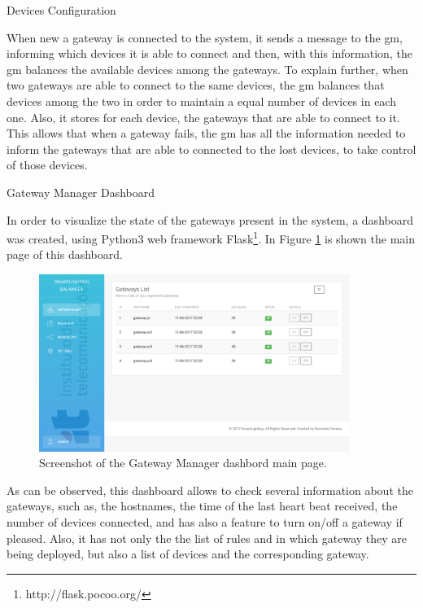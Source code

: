 \begin{Paragraph}{Devices Configuration}

When new a gateway is connected to the system, it sends a message to the \ac{gm}, informing which devices it is able to connect and then, with this information, the \ac{gm} balances the available devices among the gateways. To explain further, when two gateways are able to connect to the same devices, the \ac{gm} balances that devices among the two in order to maintain a equal number of devices in each one. Also, it stores for each device, the gateways that are able to connect to it. This allows that when a gateway fails, the \ac{gm} has all the information needed to inform the gateways that are able to connected to the lost devices, to take control of those devices.

\end{Paragraph}

\begin{Paragraph}{Gateway Manager Dashboard}

In order to visualize the state of the gateways present in the system, a dashboard was created, using Python3 web framework Flask\footnote{http://flask.pocoo.org/}. In Figure \ref{fig:main_gm} is shown the main page of this dashboard.

\begin{figure}[H]
	\centering
	\includegraphics[width=0.9\textwidth]{figures/main_gm.png}
	\caption{Screenshot of the Gateway Manager dashbord main page.}
	\label{fig:main_gm}
\end{figure}

As can be observed, this dashboard allows to check several information about the gateways, such as, the hostnames, the time of the last heart beat received, the number of devices connected, and has also a feature to turn on/off a gateway if pleased. Also, it has not only the the list of rules and in which gateway they are being deployed, but also a list of devices and the corresponding gateway.


\end{Paragraph}

